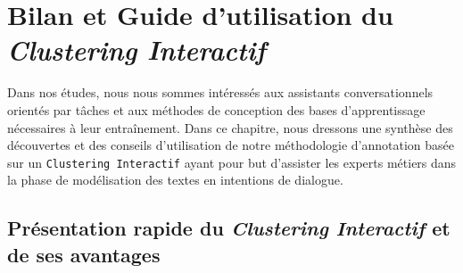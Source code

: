 \chapter{Bilan et Guide d'utilisation du \textit{Clustering Interactif}}
\label{chapter:5-GUIDE}
	
	Dans nos études, nous nous sommes intéressés aux assistants conversationnels orientés par tâches et aux méthodes de conception des bases d'apprentissage nécessaires à leur entraînement.
	Dans ce chapitre, nous dressons une synthèse des découvertes et des conseils d'utilisation de notre méthodologie d'annotation basée sur un \texttt{Clustering Interactif} ayant pour but d'assister les experts métiers dans la phase de modélisation des textes en intentions de dialogue.
	
	\section{Présentation rapide du \textit{Clustering Interactif} et de ses avantages}
		\label{section:5.1-GUIDE-PRESENTATION-RAPIDE}
		
		
